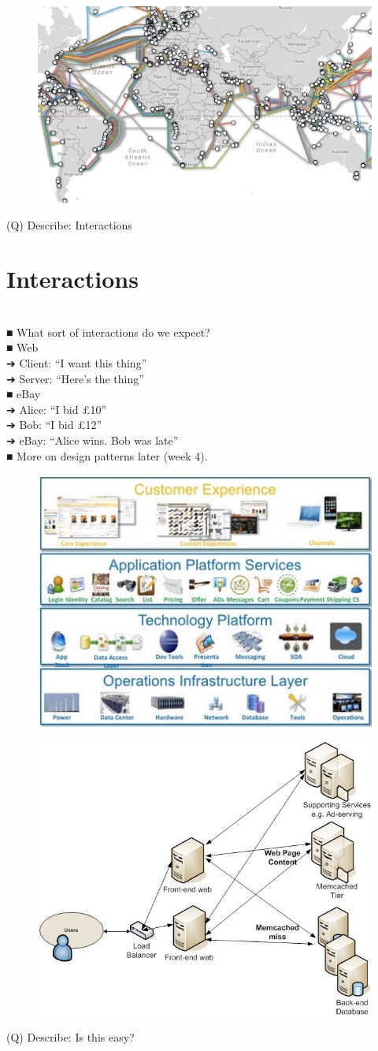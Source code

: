\documentclass[12pt]{article}
\begin{document}
\begin{figure}[H]
\includegraphics[width=0.5\linewidth]{page15-image-4.png}
\end{figure}
\clearpage
(Q)
Describe: Interactions
\clearpage
\section{Interactions}
\\
■ What sort of interactions do we expect?\\
■ Web\\
➔ Client: “I want this thing”\\
➔ Server: “Here’s the thing”\\
■ eBay\\
➔ Alice: “I bid £10”\\
➔ Bob: “I bid £12”\\
➔ eBay: “Alice wins. Bob was late”\\
■ More on design patterns later (week 4).\\
\begin{figure}[H]
\includegraphics[width=0.5\linewidth]{page16-image-1.png}
\end{figure}
\begin{figure}[H]
\includegraphics[width=0.5\linewidth]{page16-image-2.png}
\end{figure}
\clearpage
(Q)
Describe: Is this easy?
\clearpage
\end{document}
